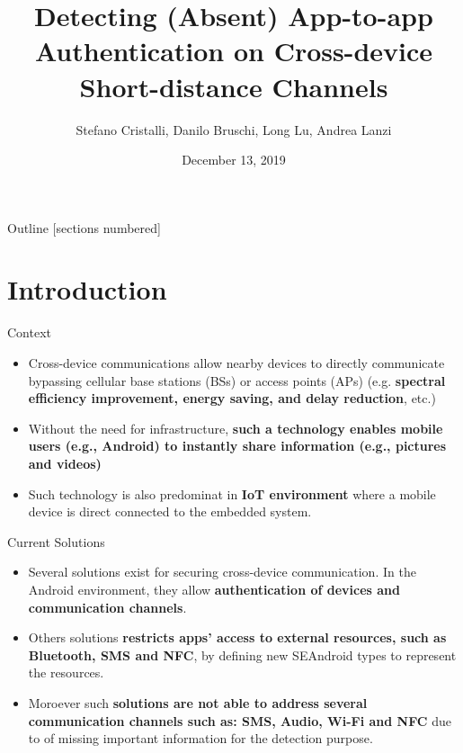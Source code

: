 \documentclass[10pt]{beamer}
\title{Detecting (Absent) App-to-app Authentication on Cross-device
Short-distance Channels}
\date{December 13, 2019}
\author{Stefano Cristalli, Danilo Bruschi, Long Lu, Andrea Lanzi}
\institute{University of Milan Italy Northeastern University Boston US}
\begin{document}
\maketitle 

\begin{frame}{Outline}
  [sections numbered]
  \tableofcontents[hideallsubsections]
\end{frame}

\section{Introduction}
\begin{frame}[fragile]{Context}
  \begin{itemize}

  \item Cross-device communications allow nearby devices to directly
    communicate bypassing cellular base stations (BSs) or access
    points (APs) (e.g. {\bf spectral efficiency improvement, energy
      saving, and delay reduction}, etc.)

  \item Without the need for infrastructure, {\bf such a technology
      enables mobile users (e.g., Android) to instantly share
      information (e.g., pictures and videos)}

  \item Such technology is also predominat in {\bf IoT environment}
    where a mobile device is direct connected to the embedded system.

   \end{itemize}


  
\end{frame}

\begin{frame}[fragile]{Current Solutions}
  \begin{itemize}

  \item Several solutions exist for securing cross-device
    communication.  In the Android environment, they allow
    {\bf authentication of devices and communication channels}.

  \item Others solutions {\bf restricts apps’ access to external
      resources, such as Bluetooth, SMS and NFC}, by defining new
    SEAndroid types to represent the resources.

  \item Moroever such {\bf solutions are not able to address several
      communication channels such as: SMS, Audio, Wi-Fi and NFC} due
    to of missing important information for the detection purpose.

  \end{itemize} 

  
\end{frame}
\end{document}
